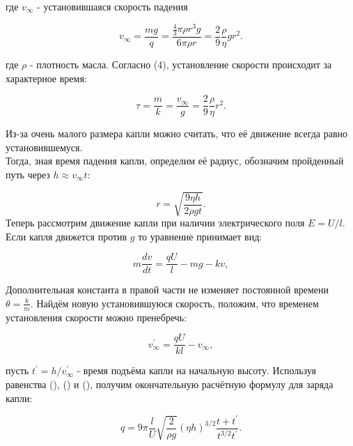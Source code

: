 \documentclass{lab}
\begin{document}
где $v_{\infty}$ - установившаяся скорость падения

\begin{equation}
    v_{\infty} = \frac{mg}{q}=\frac{\frac{4}{3} \pi \rho r^{3} g}{6 \pi \rho r}=\frac{2}{9}\frac{\rho}{\eta}g r^{2}.
    \label{eq:speed_inf_calculated}
\end{equation}

где $\rho$ - плотность масла. Согласно (4), установление скорости происходит за характерное время:

\begin{equation}
    \tau = \frac{m}{k}=\frac{v_{\infty}}{g} = \frac{2}{9}\frac{\rho}{\eta} r^{2}.
    \label{eq:tau}
\end{equation}

Из-за очень малого размера капли можно считать, что её движение всегда равно \\ установившемуся.
\\
Тогда, зная время падения капли, определим её радиус, обозначим пройденный путь через $h \approx v_{\infty}t$:

\begin{equation}
    r = \sqrt{\frac{9 \eta h}{2 \rho gt} }.
    \label{eq:radius}
\end{equation}
\newpage
Теперь рассмотрим движение капли при наличии электрического поля $E=U/l$. Если капля движется против $g$ то уравнение принимает вид:

\begin{equation}
    m\frac{dv}{dt} = \frac{qU}{l} - mg - kv,
\end{equation}

Дополнительная константа в правой части не изменяет постоянной времени $\theta = \frac{k}{m}$. Найдём новую установившуюся скорость, положим, что временем установления скорости можно пренебречь:

\begin{equation}
    v_{\infty}^{'} = \frac{qU}{kl} - v_{\infty},
    \label{eq:v_inf_real}
\end{equation}

пусть $t^{'} = h/v^{'}_{\infty}$ - время подъёма капли на начальную высоту. Используя равенства (), () и (), получим окончательную расчётную формулу для заряда капли:

\begin{equation}
    q = 9\pi \frac{l}{U} \sqrt{\frac{2}{\rho g}} (\eta h)^{3/2} \frac{t + t^{'}}{t^{3/2} t^{'}}.
    \label{eq:q_final}
\end{equation}
\end{document}
